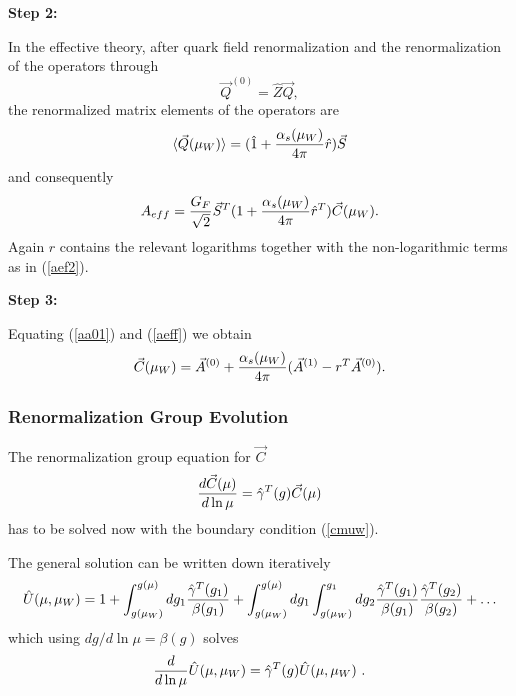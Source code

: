 \documentclass[12pt,rotate]{article}
\def\as{\alpha_s}
\begin{document}
\begin{itemize}
\begin{itemize}
\begin{itemize}
{\bf Step 2:}

In the effective theory,
after quark field renormalization and the
renormalization of the operators through
\begin{equation}\label{q0z3}
\vec Q^{(0)}=\hat Z\vec Q,  
\end{equation}
the renormalized matrix elements of the operators
are
\begin{equation}\label{qars}
\langle\vec Q(\mu_W)\rangle=(\hat 1
+{\as(\mu_W)\over 4\pi} \hat r)\vec S  \end{equation}
and consequently
\begin{equation}\label{aeff}  A_{eff}=
{G_F\over\sqrt{2}}\vec S^T(1+{\as(\mu_W)\over 4\pi} \hat r^T) 
\vec C(\mu_W).\end{equation}
Again $\hat r$ contains the relevant logarithms together with
the non-logarithmic terms as in (\ref{aef2}).

{\bf Step 3:}

Equating (\ref{aa01}) and (\ref{aeff}) we obtain
\begin{equation}\label{cmuw} 
\vec C(\mu_W)=
\vec A^{(0)}+{\as(\mu_W)\over 4\pi}
(\vec A^{(1)}-r^T\vec A^{(0)}).
\end{equation}

\subsubsection{Renormalization Group Evolution}
The renormalization group equation for $\vec C$
\begin{equation}\label{rgcv}
{d \vec C(\mu)\over d\ln\mu}=\hat\gamma^T(g)\vec C(\mu)   
\end{equation}
has to be solved now with the boundary condition (\ref{cmuw}). 

The general solution can be written down iteratively
\begin{equation}\label{uit}
\hat U(\mu,\mu_W)=1+\int^{g(\mu)}_{g(\mu_W)}
dg_1{\hat\gamma^T(g_1)\over\beta(g_1)}+
\int^{g(\mu)}_{g(\mu_W)}dg_1\int^{g_1}_{g(\mu_W)}dg_2
{\hat\gamma^T(g_1)\over\beta(g_1)}{\hat\gamma^T(g_2)\over\beta(g_2)}+\ldots 
\end{equation}
which using $dg/d\ln\mu=\beta(g)$  solves
\begin{equation}\label{rgu}
{d\over d\ln\mu}\hat U(\mu, \mu_W)=\hat\gamma^T(g)\hat U(\mu, \mu_W)~.
   \end{equation}


\end{itemize}
\end{itemize}
\end{itemize}
\end{document}
